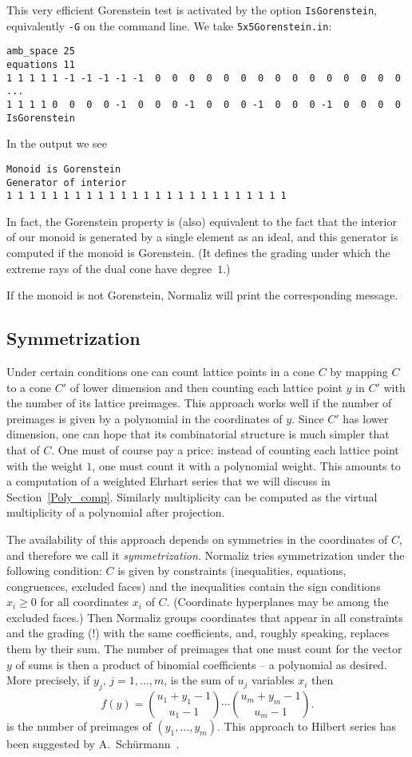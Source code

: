 \documentclass[12pt,a4paper]{scrartcl}
\theoremstyle{definition}
\def\ttt{\texttt}
\begin{document}
This very efficient Gorenstein test is activated by the option \ttt{IsGorenstein}, equivalently \ttt{-G} on the command line. We take \verb|5x5Gorenstein.in|:

\begin{Verbatim}
amb_space 25
equations 11
1 1 1 1 1 -1 -1 -1 -1 -1  0  0  0  0  0  0  0  0  0  0  0  0  0  0  0
...
1 1 1 1 0  0  0  0 -1  0  0  0 -1  0  0  0 -1  0  0  0 -1  0  0  0  0
IsGorenstein
\end{Verbatim}

In the output we see
\begin{Verbatim}
Monoid is Gorenstein 
Generator of interior
1 1 1 1 1 1 1 1 1 1 1 1 1 1 1 1 1 1 1 1 1 1 1 1 1 
\end{Verbatim}

In fact, the Gorenstein property is (also) equivalent to the fact that the interior of our monoid is generated by a single element as an ideal, and this generator is computed if the monoid is Gorenstein. (It defines the grading under which the extreme rays of the dual cone have degree~$1$.)

If the monoid is not Gorenstein, Normaliz will print the corresponding message.

\subsection{Symmetrization}\label{symmetrize}

Under certain conditions one can count lattice points in a cone $C$ by mapping $C$ to a cone $C'$ of lower dimension and then counting each lattice point $y$ in $C'$ with the number of its lattice preimages. This approach works well if the number of preimages is given by a polynomial in the coordinates of $y$. Since $C'$ has lower dimension, one can hope that its combinatorial structure is much simpler that that of $C$. One must of course pay a price: instead of counting each lattice point with the weight $1$, one must count it with a polynomial weight. This amounts to a computation of a weighted Ehrhart series that we will discuss in Section~\ref{Poly_comp}. Similarly multiplicity can be computed as the virtual multiplicity of a polynomial after projection.

The availability of this approach depends on symmetries in the coordinates of $C$, and therefore we call it \emph{symmetrization}. Normaliz tries symmetrization under the following condition: $C$ is given by constraints (inequalities, equations, congruences, excluded faces) and the inequalities contain the sign conditions $x_i\ge 0$ for all coordinates $x_i$ of $C$. (Coordinate hyperplanes may be among the excluded faces.) Then Normaliz groups coordinates that appear in all constraints and the grading (!) with the same coefficients, and, roughly speaking, replaces them by their sum. The number of preimages that one must count for the vector $y$ of sums is then a product of binomial coefficients -- a polynomial as desired. More precisely, if $y_j$, $j=1,\dots,m$, is the sum of $u_j$ variables $x_i$ then
$$
f(y)=\binom{u_1+y_1-1}{u_1-1}\cdots \binom{u_m+y_m-1}{u_m-1}.
$$
is the number of preimages of $(y_1,\dots,y_m)$. This approach to Hilbert series has been suggested by A.~Sch\"urmann~\cite{Sch}.
\end{document}
